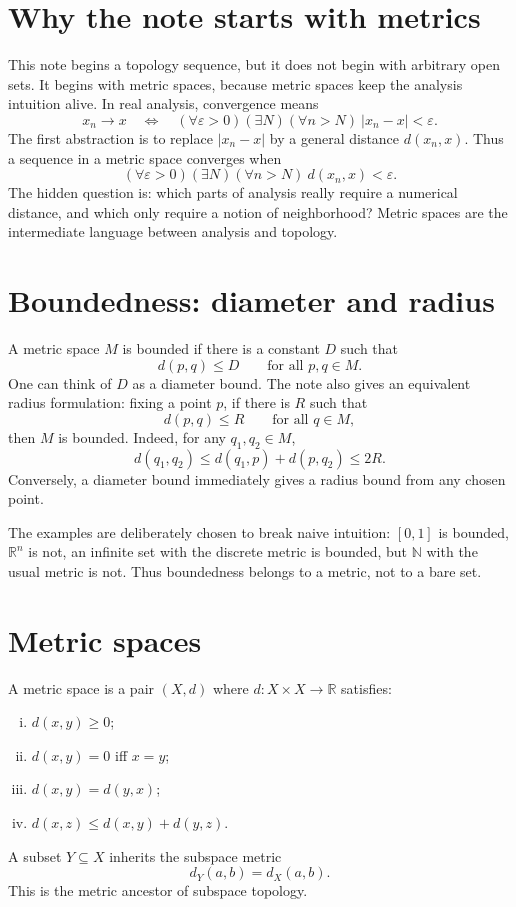 
\section{Why the note starts with metrics}

This note begins a topology sequence, but it does not begin with arbitrary open sets.  It begins with metric spaces, because metric spaces keep the analysis intuition alive.  In real analysis, convergence means
\[
  x_n\to x
  \quad\Longleftrightarrow\quad
  (\forall \varepsilon>0)(\exists N)(\forall n>N)\ |x_n-x|<\varepsilon.
\]
The first abstraction is to replace $|x_n-x|$ by a general distance $d(x_n,x)$.  Thus a sequence in a metric space converges when
\[
  (\forall \varepsilon>0)(\exists N)(\forall n>N)\ d(x_n,x)<\varepsilon.
\]
The hidden question is: which parts of analysis really require a numerical distance, and which only require a notion of neighborhood?  Metric spaces are the intermediate language between analysis and topology.

\section{Boundedness: diameter and radius}

A metric space $M$ is bounded if there is a constant $D$ such that
\[
  d(p,q)\le D\qquad \text{for all }p,q\in M.
\]
One can think of $D$ as a diameter bound.  The note also gives an equivalent radius formulation: fixing a point $p$, if there is $R$ such that
\[
  d(p,q)\le R\qquad \text{for all }q\in M,
\]
then $M$ is bounded.  Indeed, for any $q_1,q_2\in M$,
\[
  d(q_1,q_2)\le d(q_1,p)+d(p,q_2)\le 2R.
\]
Conversely, a diameter bound immediately gives a radius bound from any chosen point.

The examples are deliberately chosen to break naive intuition: $[0,1]$ is bounded, $\mathbb R^n$ is not, an infinite set with the discrete metric is bounded, but $\mathbb N$ with the usual metric is not.  Thus boundedness belongs to a metric, not to a bare set.

\section{Metric spaces}

A metric space is a pair $(X,d)$ where $d:X\times X\to \mathbb R$ satisfies:
\begin{enumerate}[(i)]
  \item $d(x,y)\ge0$;
  \item $d(x,y)=0$ iff $x=y$;
  \item $d(x,y)=d(y,x)$;
  \item $d(x,z)\le d(x,y)+d(y,z)$.
\end{enumerate}
A subset $Y\subseteq X$ inherits the subspace metric
\[
  d_Y(a,b)=d_X(a,b).
\]
This is the metric ancestor of subspace topology.

